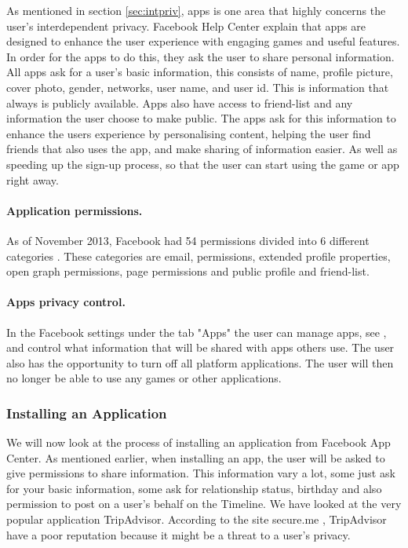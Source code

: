 As mentioned in section \ref{sec:intpriv}, apps is one area that highly concerns the user's interdependent privacy. Facebook Help Center \cite{faceHelp} explain that apps are designed to enhance the user experience with engaging games and useful features. In order for the apps to do this, they ask the user to share personal information. All apps ask for a user's basic information, this consists of name, profile picture, cover photo, gender, networks, user name, and user id. This is information that always is publicly available. Apps also have access to friend-list and any information the user choose to make public. The apps ask for this information to enhance the users experience by personalising content, helping the user find friends that also uses the app, and make sharing of information easier. As well as speeding up the sign-up process, so that the user can start using the game or app right away. 

\paragraph{Application permissions.} As of November 2013, Facebook had 54 permissions divided into 6 different categories \cite{permission}. These categories are email, permissions, extended profile properties, open graph permissions, page permissions and public profile and friend-list. 

\paragraph{Apps privacy control.}In the Facebook settings \cite{facebooksettings} under the tab "Apps" the user can manage apps, see , and control what information that will be shared with apps others use. The user also has the opportunity to turn off all platform applications. The user will then no longer be able to use any games or other applications.

\subsubsection{Installing an Application}
We will now look at the process of installing an application from Facebook App Center. As mentioned earlier, when installing an app, the user will be asked to give permissions to share information. This information vary a lot, some just ask for your basic information, some ask for relationship status, birthday and also permission to post on a user's behalf on the Timeline. We have looked at the very popular application TripAdvisor. According to the site secure.me \cite{secure.me}, TripAdvisor have a poor reputation because it might be a threat to a user's privacy.  

